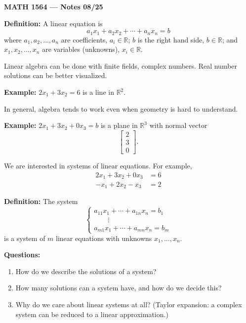 \documentclass{article}
\begin{document}
\textbf{MATH 1564 --- Notes 08/25}

\bigskip

\textbf{Definition:} A linear equation is
\[
a_1 x_1 + a_2 x_2 + \cdots + a_n x_n = b
\]
where $a_1, a_2, \ldots, a_n$ are coefficients, $a_i \in \mathbb{R}$; $b$ is the right hand side, $b \in \mathbb{R}$; and $x_1, x_2, \ldots, x_n$ are variables (unknowns), $x_i \in \mathbb{R}$.

\medskip

Linear algebra can be done with finite fields, complex numbers. Real number solutions can be better visualized.

\medskip

\textbf{Example:} $2x_1 + 3x_2 = 6$ is a line in $\mathbb{R}^2$.

\bigskip

In general, algebra tends to work even when geometry is hard to understand.

\medskip

\textbf{Example:} $2x_1 + 3x_2 + 0x_3 = b$ is a plane in $\mathbb{R}^3$ with normal vector
\[
\begin{bmatrix} 2 \\ 3 \\ 0 \end{bmatrix}.
\]

\bigskip

We are interested in systems of linear equations. For example,
\begin{align*}
2x_1 + 3x_2 + 0x_3 &= 6 \\
-x_1 + 2x_2 - x_3 &= 2
\end{align*}

\bigskip

\textbf{Definition:} The system
\[
\begin{cases}
a_{11} x_1 + \cdots + a_{1n} x_n = b_1 \\
\qquad \vdots \\
a_{m1} x_1 + \cdots + a_{mn} x_n = b_m
\end{cases}
\]
is a system of $m$ linear equations with unknowns $x_1, \ldots, x_n$.

\bigskip

\textbf{Questions:}
\begin{enumerate}
\item How do we describe the solutions of a system?
\item How many solutions can a system have, and how do we decide this?
\item Why do we care about linear systems at all? (Taylor expansion: a complex system can be reduced to a linear approximation.)
\end{enumerate}
\end{document}
